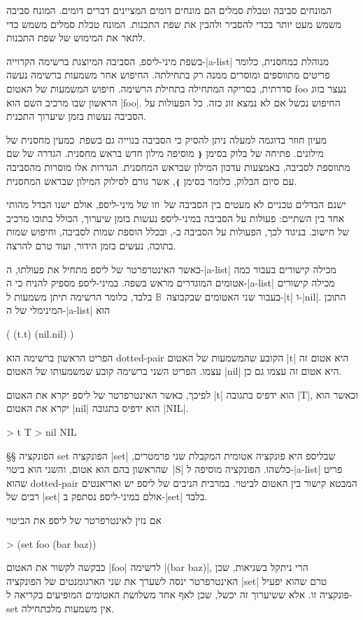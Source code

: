המונחים סביבה וטבלת סמלים הם מונחים דומים המציינים דברים דומים. המונח סביבה
משמש מעט יותר בכדי להסביר ולהבין את שפת התכנות. המונח טבלת סמלים משמש
כדי לתאר את המימוש של שפת התכנות.

בשפת מיני-ליספ, הסביבה המיוצגת ברשימה הקרוייה-\E|a-list| מנוהלת כמחסנית, כלומר
פריטים מתווספים ומוסרים ממנה רק בתחילתה. החיפוש אחר משמעות ברשימה נעשה סדרתית,
בסריקה המתחילה בתחילת הרשימה. חיפוש המשמעות של האטום foo נעצר בזוג הראשון שבו
מרכיב השם הוא \E|foo|. החיפוש נכשל אם לא נמצא זוג כזה. כל הפעולות על הסביבה
נעשות בזמן שיערוך התכנית.

מעיון חוזר בדוגמה למעלה ניתן להסיק כי הסביבה בנוייה גם בשפת~\CPL כמעין מחסנית
של מילונים. פתיחה של בלוק בסימן \texttt{❴} מוסיפה מילון חדש בראש מחסנית.  הגדרה
של שם מתווספת לסביבה, באמצעות עדכון המילון שבראש המחסנית.  הגדרות אלו מוסרות
מהסביבה עם סיום הבלוק, כלומר בסימן \texttt{❵}, אשר גורם לסילוק המילון שבראש המחסנית.

ישנם הבדלים טכניים לא מעטים בין הסביבה של~\CPL וזו של מיני-ליספ, אולם ישנו הבדל
מהותי אחד בין השתיים: פעולות על הסביבה במיני-ליספ נעשות בזמן שיערוך, הכולל בתוכו
מרכיב של חישוב. בניגוד לכך, הפעולות על הסביבה ב-\CPL, ובכלל הוספת שמות לסביבה,
וחיפוש שמות בתוכה, נעשים בזמן הידור, ועוד טרם להרצה.

כאשר האינטרפרטר של ליספ מתחיל את פעולתו, ה-\E|a-list| מכילה קישורים בעבור כמה
אטומים המוגדרים מראש בשפה. במיני-ליספ מספיק להניח כי ה-\E|a-list| מכילה קישורים
בעבור שני האטומים שבקבוצה~$𝔹$ בלבד, כלומר הרשימה תיתן משמעות ל-\E|t| ו-\E|nil|.
התוכן המינימלי של ה-\E|a-list| הוא
\begin{LISP}
(
  (t.t)
  (nil.nil)
)
\end{LISP}

הפריט הראשון ברשימה הוא dotted-pair הקובע שהמשמעות של האטום \T|t| היא אטום זה
עצמו. הפריט השני ברשימה קובע שמשמעותו של האטום \T|nil| היא אטום זה עצמו גם כן.

לפיכך, כאשר האינטרפרטר של ליספ יקרא את האטום \T|t| הוא ידפיס בתגובה \T|T|,
וכאשר הוא יקרא את האטום \T|nil| הוא ידפיס בתגובה \T|NIL|.
\begin{LISP}
> t
T
> nil
NIL
\end{LISP}

§§ הפונקציה set
הפונקציה \T|set| שבליספ היא פונקציה אטומית המקבלת שני פרמטרים, שהראשון בהם
הוא אטום, והשני הוא ביטוי~\E|S| כלשהו. הפונקציה מוסיפה ל-\E|a-list| פריט שהוא
dotted-pair המבטא קישור בין האטום לביטוי. במרבית הניבים של ליספ יש ואריאנטים
רבים של \T|set| אולם במיני-ליספ נסתפק ב-\T|set| בלבד.

אם נזין לאינטרפרטר של ליספ את הביטוי
\begin{LISP}
> (set foo (bar baz))
\end{LISP}
כבקשה לקשור את האטום \T|foo| לרשימה \T|(bar baz)|, הרי ניתקל בשגיאות, שכן
האינטרפרטר ינסה לשערך את שני הארגומנטים של הפונקציה \E|set| טרם שהוא יפעיל
פונקציה זו. אלא ששיערוך זה יכשל, שכן לאף אחד משלושת האטומים המופיעים בקריאה
ל-set אין משמעות מלכתחילה.

